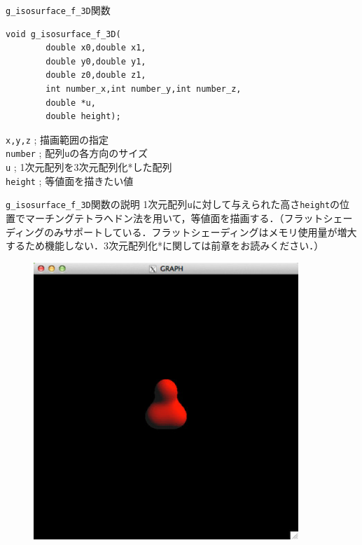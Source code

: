 \documentclass[a4paper,12pt]{jsarticle}%
\begin{document}
\begin{itembox}[l]{\texttt{g\_isosurface\_f\_3D}関数}
\begin{verbatim}
void g_isosurface_f_3D(
        double x0,double x1,
        double y0,double y1,
        double z0,double z1,
        int number_x,int number_y,int number_z,
        double *u,
        double height);
\end{verbatim}
\verb|x,y,z| ; 描画範囲の指定\\
\verb|number| ; 配列\verb|u|の各方向のサイズ\\
\verb|u| ; 1次元配列を3次元配列化*した配列\\
\verb|height| ; 等値面を描きたい値\\
\end{itembox}

\begin{itembox}[l]{\texttt{g\_isosurface\_f\_3D}関数の説明}
1次元配列\verb|u|に対して与えられた高さ\verb|height|の位置でマーチングテトラへドン法を用いて，等値面を描画する．（フラットシェーディングのみサポートしている．フラットシェーディングはメモリ使用量が増大するため機能しない．3次元配列化*に関しては前章をお読みください．）
\end{itembox}

\begin{figure}[htb]
	\includegraphics[width=100mm]{./Figures/eps/Canvas_g_isosurface.eps}
\end{figure}
\end{document}
